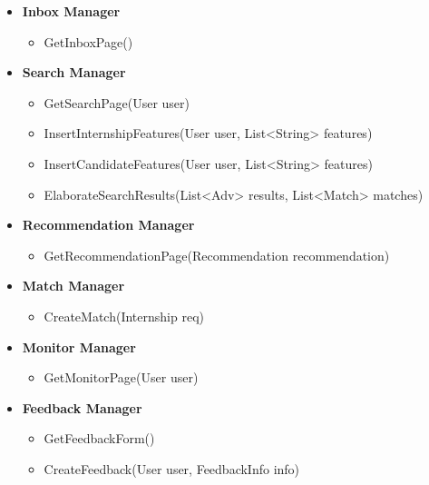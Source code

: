 \begin{itemize}
    \item \textbf{Inbox Manager}
        \begin{itemize}
            \item GetInboxPage()
        \end{itemize}
        
    \item \textbf{Search Manager}
        \begin{itemize}
            \item GetSearchPage(User user)
            \item InsertInternshipFeatures(User user, List<String> features)
            \item InsertCandidateFeatures(User user, List<String> features)
            \item ElaborateSearchResults(List<Adv> results, List<Match> matches)
        \end{itemize}
        
    \item \textbf{Recommendation Manager}
        \begin{itemize}
            \item GetRecommendationPage(Recommendation recommendation) 
        \end{itemize}
        
    \item \textbf{Match Manager}
        \begin{itemize}
            \item CreateMatch(Internship req)
        \end{itemize}
        
    \item \textbf{Monitor Manager}
        \begin{itemize}
            \item GetMonitorPage(User user)
        \end{itemize}
        
    \item \textbf{Feedback Manager}
        \begin{itemize}
            \item GetFeedbackForm()
            \item CreateFeedback(User user, FeedbackInfo info)
        \end{itemize}
        

\end{itemize}
